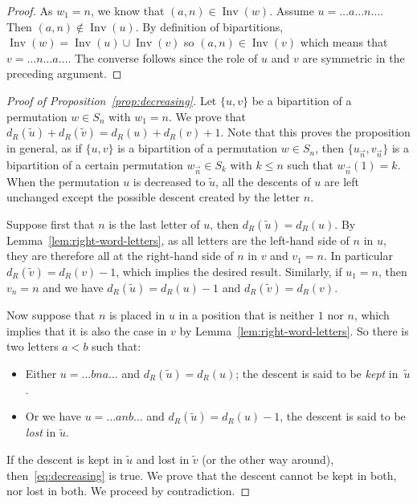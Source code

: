 \documentclass[ALCO,Unicode]{cedram}
\theoremstyle{definition}
\DeclareMathOperator{\invs}{Inv}
\newcommand{\dec}[1]{\widetilde{#1}}
\newcommand{\R}{{\overrightarrow{n}}}
\newcommand{\dd}{d_R}
\begin{document}
\begin{proof}
As $w_1 = n$, we know that $(a,n) \in \invs(w)$. Assume $u=\dots a \dots n\dots$. Then $(a,n) \not\in \invs(u)$. By definition of bipartitions, $\invs(w) = \invs(u) \cup \invs(v)$ so $(a,n) \in \invs(v)$ which means that $v=\dots n\dots a\dots$. The converse follows since the role of $u$ and $v$ are symmetric in the preceding argument. 
\end{proof}

\begin{proof}[Proof of Proposition~\ref{prop:decreasing}]
Let $\lbrace u, v \rbrace$ be a bipartition of a permutation $w \in S_n$ with $w_1 = n$. We prove that $\dd(\dec{u}) + \dd(\dec{v}) = \dd(u) + \dd(v) +1$. Note that this proves the proposition in general, as if $\lbrace u, v \rbrace$ is a bipartition of a permutation $w \in S_n$, then $\lbrace u_\R, v_\R \rbrace$ is a bipartition of a certain permutation $w_\R \in S_k$ with $k \leq n$ such that ${w_\R}(1) = k$. When the permutation $u$ is decreased to $\dec{u}$, all the descents of $u$ are left unchanged except the possible descent created by the letter $n$. 

Suppose first that $n$ is the last letter of $u$, then $\dd(\dec{u}) = \dd(u)$. By Lemma~\ref{lem:right-word-letters}, as all letters are the left-hand side of $n$ in $u$, they are therefore all at the right-hand side of $n$ in $v$ and $v_1 = n$. In particular $\dd(\dec{v}) = \dd(v) -1$, which implies the desired result. Similarly, if $u_1 =n$, then $v_n = n$ and we have $\dd(\dec{u}) = \dd(u) - 1$ and $\dd(\dec{v}) = \dd(v)$.

Now suppose that $n$ is placed in $u$ in a position that is neither $1$ nor $n$, which implies that it is also the case in $v$ by Lemma~\ref{lem:right-word-letters}. So  there is two letters $a<b$ such that:
\begin{itemize}
\item Either $u = \dots bna \dots$ and $\dd(\dec{u}) = \dd(u)$; the descent is said to be {\em kept} in~$\dec{u}$. 
\item Or we have $u = \dots anb \dots$ and $\dd(\dec{u}) = \dd(u) - 1$, the descent is said to be {\em lost} in $\dec{u}$. 
\end{itemize}
If the descent is kept in $\dec{u}$ and lost in $\dec{v}$ (or the other way around), then~\eqref{eq:decreasing} is true. We prove that the descent cannot be kept in both, nor lost in both. We proceed by contradiction.


\end{proof}
\end{document}
